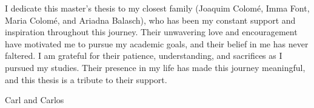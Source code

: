 
\begin{dedication}
I dedicate this master's thesis to my closest family (Joaquim Colomé, Imma Font, Maria Colomé, and Ariadna Balasch), who has been my constant support and inspiration throughout this journey. Their unwavering love and encouragement have motivated me to pursue my academic goals, and their belief in me has never faltered. I am grateful for their patience, understanding, and sacrifices as I pursued my studies. Their presence in my life has made this journey meaningful, and this thesis is a tribute to their support. 

Carl and Carlos
\newpage

\end{dedication}
